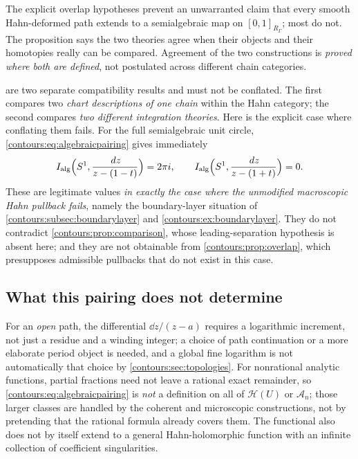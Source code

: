 \documentclass[11pt,letterpaper]{article}
\theoremstyle{definition}
\theoremstyle{remark}
\newcommand{\HH}{\mathcal H}\newcommand{\A}{\mathscr A}\newcommand{\OO}{\mathcal O}
\numberwithin{equation}{section}
\begin{document}
The explicit overlap hypotheses prevent an unwarranted claim that every smooth
Hahn-deformed path extends to a semialgebraic map on $[0,1]_{R_\Gamma}$; most do
not. The proposition says the two theories agree when their objects and their
homotopies really can be compared. Agreement of the two constructions is
\emph{proved where both are defined}, not postulated across different chain
categories.

 are two separate
compatibility results and must not be conflated. The first compares two
\emph{chart descriptions of one chain} within the Hahn category; the second
compares \emph{two different integration theories}. Here is the explicit case where
conflating them fails. For the full semialgebraic unit circle,
\eqref{contours:eq:algebraicpairing} gives immediately
\begin{equation}\label{contours:eq:algcircleboundary}
  I_{\mathrm{alg}}\Bigl(S^1,\frac{\,d z}{z-(1-t)}\Bigr)=2\pi i,
  \qquad
  I_{\mathrm{alg}}\Bigl(S^1,\frac{\,d z}{z-(1+t)}\Bigr)=0 .
\end{equation}
These are legitimate values \emph{in exactly the case where the unmodified
macroscopic Hahn pullback fails}, namely the boundary-layer situation of
\cref{contours:subsec:boundarylayer} and \cref{contours:ex:boundarylayer}. They do
not contradict \cref{contours:prop:comparison}, whose leading-separation hypothesis
is absent here; and they are not obtainable from \cref{contours:prop:overlap}, which
presupposes admissible pullbacks that do not exist in this case.

\subsection{What this pairing does not determine}
For an \emph{open} path, the differential $\dd z/(z-a)$ requires a logarithmic
increment, not just a residue and a winding integer; a choice of path continuation
or a more elaborate period object is needed, and a global fine logarithm is not
automatically that choice by \cref{contours:sec:topologies}. For nonrational
analytic functions, partial fractions need not leave a rational exact remainder, so
\eqref{contours:eq:algebraicpairing} is \emph{not} a definition on all of $\HH(U)$
or $\A_n$; those larger classes are handled by the coherent and microscopic
constructions, not by pretending that the rational formula already covers them. The
functional also does not by itself extend to a general Hahn-holomorphic function
with an infinite collection of coefficient singularities.
\end{document}
